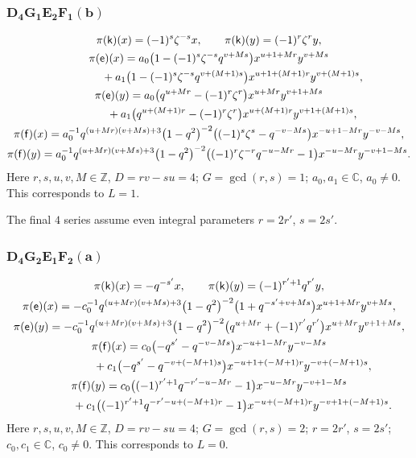 \documentclass[pdftex]{sigma}
\numberwithin{equation}{section}
\begin{document}
\subsubsection*{$\boldsymbol{D_4G_1E_2F_1(b)}$}
\begin{gather*}
\pi(\mathsf{k})(x)= (-1)^s\zeta^{-s}x ,\qquad\pi(\mathsf{k})(y)=(-1)^r\zeta^ry ,\\
\pi(\mathsf{e})(x)= a_0\big(1-(-1)^s\zeta^{-s}q^{v+Ms}\big)x^{u+1+Mr}y^{v+Ms}\\
\hphantom{\pi(\mathsf{e})(x)=}{} + a_1\big(1-(-1)^s\zeta^{-s}q^{v+(M+1)s}\big)x^{u+1+(M+1)r}y^{v+(M+1)s} ,\\
\pi(\mathsf{e})(y)= a_0\big(q^{u+Mr}-(-1)^r\zeta^r\big)x^{u+Mr}y^{v+1+Ms}\\
\hphantom{\pi(\mathsf{e})(y)=}{} + a_1\big(q^{u+(M+1)r}-(-1)^r\zeta^r\big)x^{u+(M+1)r}y^{v+1+(M+1)s} ,\\
\pi(\mathsf{f})(x)= a_0^{-1}q^{(u+Mr)(v+Ms)+3}\big(1-q^2\big)^{-2}\big((-1)^s\zeta^s-q^{-v-Ms}\big)x^{-u+1-Mr}y^{-v-Ms} ,\\
\pi(\mathsf{f})(y)= a_0^{-1}q^{(u+Mr)(v+Ms)+3}\big(1-q^2\big)^{-2}\big((-1)^r\zeta^{-r}q^{-u-Mr}-1\big)x^{-u-Mr}y^{-v+1-Ms} .
\end{gather*}
Here $r,s,u,v,M\in\mathbb{Z}$, $D=rv-su=4$; $G=\operatorname{gcd}(r,s)=1$; $a_0,a_1\in\mathbb{C}$, $a_0\ne 0$. This corresponds to $L=1$.

The final $4$ series assume even integral parameters $r=2r'$, $s=2s'$.

\subsubsection*{$\boldsymbol{D_4G_2E_1F_2(a)}$}
\begin{gather*}
\pi(\mathsf{k})(x)= -q^{-s'}x ,\qquad\pi(\mathsf{k})(y)=(-1)^{r'+1}q^{r'}y ,\\
\pi(\mathsf{e})(x)= -c_0^{-1}q^{(u+Mr)(v+Ms)+3}\big(1-q^2\big)^{-2}\big(1+q^{-s'+v+Ms}\big)x^{u+1+Mr}y^{v+Ms} ,\\
\pi(\mathsf{e})(y)= -c_0^{-1}q^{(u+Mr)(v+Ms)+3}\big(1-q^2\big)^{-2}\big(q^{u+Mr}+(-1)^{r'}q^{r'}\big)x^{u+Mr}y^{v+1+Ms} ,\\
\pi(\mathsf{f})(x)= c_0\big({-}q^{s'}-q^{-v-Ms}\big)x^{-u+1-Mr}y^{-v-Ms}\\
\hphantom{\pi(\mathsf{f})(x)=}{} + c_1\big({-}q^{s'}-q^{-v+(-M+1)s}\big)x^{-u+1+(-M+1)r}y^{-v+(-M+1)s} ,\\
\pi(\mathsf{f})(y)= c_0\big((-1)^{r'+1}q^{-r'-u-Mr}-1\big)x^{-u-Mr}y^{-v+1-Ms}\\
\hphantom{\pi(\mathsf{f})(y)=}{} + c_1\big((-1)^{r'+1}q^{-r'-u+(-M+1)r}-1\big)x^{-u+(-M+1)r}y^{-v+1+(-M+1)s} .
\end{gather*}
Here $r,s,u,v,M\in\mathbb{Z}$, $D=rv-su=4$; $G=\operatorname{gcd}(r,s)=2$; $r=2r'$, $s=2s'$; $c_0,c_1\in\mathbb{C}$, $c_0\ne 0$. This corresponds to $L=0$.
\end{document}
